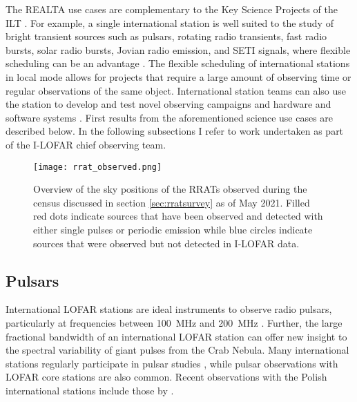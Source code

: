 The REALTA use cases are complementary to the Key Science Projects of the ILT \citep[KSP; see][]{VanHaarlem2013}. For example, a single international station is well suited to the study of bright transient sources such as pulsars, rotating radio transients, fast radio bursts, solar radio bursts, Jovian radio emission, and SETI signals, where flexible scheduling can be an advantage \citep[for example,][]{Maguire2020, Morosan2019}. The flexible scheduling of international stations in local mode allows for projects that require a large amount of observing time or regular observations of the same object. International station teams can also use the station to develop and test novel observing campaigns and hardware and software systems \citep[for example,][]{Scully2021}.  First results from the aforementioned science use cases are described below. In the following subsections I refer to work undertaken as part of the I-LOFAR chief observing team.

\begin{figure*}[t]
    \centering
    \texttt{[image: rrat\_observed.png]}
    \caption[Overview of the sky positions of RRATs observed during RRAT census.]{Overview of the sky positions of the RRATs observed during the census discussed in section \ref{sec:rratsurvey} as of May 2021. Filled red dots indicate sources that have been observed and detected with either single pulses or periodic emission while blue circles indicate sources that were observed but not detected in I-LOFAR data.}
    \label{fig:rrat-pc1}
\end{figure*}

\subsection{Pulsars}

International LOFAR stations are ideal instruments to observe radio pulsars, particularly at frequencies between 100~MHz and 200~MHz \citep{Stappers2011, Bilous2014, Noutsos2015}. Further, the large fractional bandwidth of an international LOFAR station can offer new insight to the spectral variability of giant pulses from the Crab Nebula. Many international stations regularly participate in pulsar studies \citep[for example,][]{Mereghetti2016, Bondonneau2017, Hermsen2018, Donner2019}, while pulsar observations with LOFAR core stations \citep[for example,][]{Bilous2014, Bilous2020} are also common. Recent observations with the Polish international stations include those by \cite{Blaszkiewicz2020}. 

